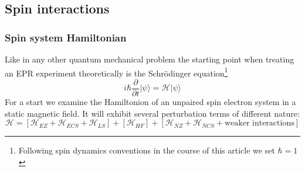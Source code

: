 \documentclass[11.5pt,a4paper]{article}
\begin{document}
\subsection{Spin interactions}
\subsubsection{Spin system Hamiltonian}
Like in any other quantum mechanical problem the starting point when treating an EPR experiment theoretically is the Schr\"odinger equation\footnote{Following spin dynamics conventions in the course of this article we set $\hbar = 1$}
\begin{equation}
 i \hbar \frac{\partial}{\partial t} |\psi\rangle = \mathcal{H} |\psi \rangle
\end{equation}
 For a start we examine the Hamiltonion of an unpaired spin electron system in a static magnetic field. It will exhibit several perturbation terms of different nature:
\begin{equation}
 \mathcal{H} = \left[\mathcal{H}_{EZ} + \mathcal{H}_{ECS} + \mathcal{H}_{LS}\right] + \left[\mathcal{H}_{HF}\right] + \left[\mathcal{H}_{NZ} + \mathcal{H}_{NCS} + \text{weaker interactions}\right]
\end{equation}
\end{document}
